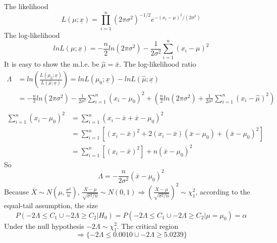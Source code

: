 \documentclass[12pt]{article}
\begin{document}
The likelihood \begin{equation*}
            L(\mu;\underline{x}) = \prod_{i=1}^{n}(2\pi\sigma^2)^{-1/2}e^{-(x_i-\mu)^2/(2\sigma^2)}
        \end{equation*} The log-likelihood \begin{equation}
            lnL(\mu;\underline{x}) = -\frac{n}{2}ln(2\pi\sigma^2)-\frac{1}{2\sigma^2}\sum_{i=1}^{n}(x_i-\mu)^2
        \end{equation} It is easy to show the m.l.e. be
\(\hat{\mu} = \bar{x}\). The log-likelihood ratio \begin{equation*}
            \begin{split}
                \Lambda &= ln( \frac{L(\mu_0;\underline{x})}{L(\hat{\mu};\underline{x})} ) = lnL(\mu_0;\underline{x}) - lnL(\hat{\mu};\underline{x}) \\
                & = -\frac{n}{2}ln(2\pi\sigma^2)-\frac{1}{2\sigma^2}\sum_{i=1}^{n}(x_i-\mu_0)^2 + (\frac{n}{2}ln(2\pi\sigma^2) + \frac{1}{2\sigma^2}\sum_{i=1}^{n}(x_i-\hat{\mu})^2) \\
            \end{split}
        \end{equation*} \begin{equation*}
            \begin{split}
                \sum_{i=1}^{n}(x_i-\mu_0)^2 & = \sum_{i=1}^{n}(x_i - \bar{x} + \bar{x} -\mu_0)^2 \\
                & = \sum_{i=1}^{n} [(x_i - \bar{x})^2 + 2(x_i - \bar{x})(\bar{x} - \mu_0) + (\bar{x} - \mu_0)^2] \\
                & = \sum_{i=1}^{n} [(x_i - \bar{x})^2] + n(\bar{x} - \mu_0)^2
            \end{split}
        \end{equation*} So \begin{equation*}
            \Lambda = -\frac{n}{2\sigma^2}(\bar{x} - \mu_0)^2
        \end{equation*} Because
\(\bar{X} \sim N(\mu, \frac{\sigma^2}{n})\),
\(\frac{\bar{X} - \mu}{\sqrt{\sigma^2/n}} \sim N(0, 1) \Rightarrow (\frac{\bar{X} - \mu}{\sqrt{\sigma^2/n}})^2 \sim \chi^2_1\),
according to the equal-tail assumption, the size \begin{equation*}
            P( -2\Lambda \le C_1\cup -2\Lambda \ge C_2 | H_0 ) = P(  -2\Lambda \le C_1 \cup-2\Lambda \ge C_2 | \mu = \mu_0 ) = \alpha  
        \end{equation*} Under the null hypothesis
\(-2\Lambda \sim \chi^2_1\). The critical region\\
\begin{equation*}
            \Rightarrow \{   -2\Lambda \le 0.0010\cup -2\Lambda \ge 5.0239\}
        \end{equation*}
\end{document}
